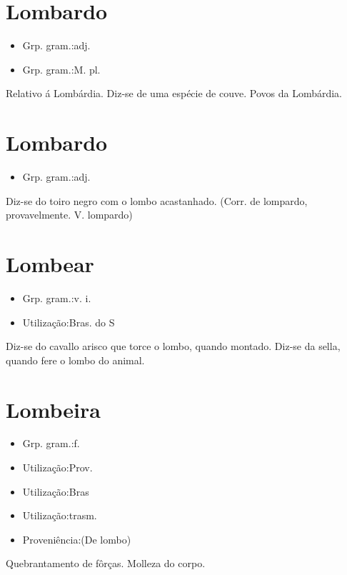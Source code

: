 \section{Lombardo}
\begin{itemize}
\item {Grp. gram.:adj.}
\end{itemize}
\begin{itemize}
\item {Grp. gram.:M. pl.}
\end{itemize}
Relativo á Lombárdia.
Diz-se de uma espécie de couve.
Povos da Lombárdia.
\section{Lombardo}
\begin{itemize}
\item {Grp. gram.:adj.}
\end{itemize}
Diz-se do toiro negro com o lombo acastanhado.
(Corr. de \textunderscore lompardo\textunderscore , provavelmente. V. \textunderscore lompardo\textunderscore )
\section{Lombear}
\begin{itemize}
\item {Grp. gram.:v. i.}
\end{itemize}
\begin{itemize}
\item {Utilização:Bras. do S}
\end{itemize}
Diz-se do cavallo arisco que torce o lombo, quando montado.
Diz-se da sella, quando fere o lombo do animal.
\section{Lombeira}
\begin{itemize}
\item {Grp. gram.:f.}
\end{itemize}
\begin{itemize}
\item {Utilização:Prov.}
\end{itemize}
\begin{itemize}
\item {Utilização:Bras}
\end{itemize}
\begin{itemize}
\item {Utilização:trasm.}
\end{itemize}
\begin{itemize}
\item {Proveniência:(De \textunderscore lombo\textunderscore )}
\end{itemize}
Quebrantamento de fôrças.
Molleza do corpo.
